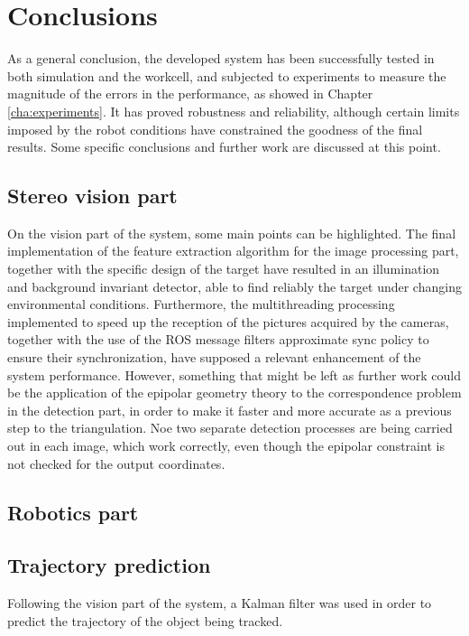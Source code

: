 
\chapter{Conclusions} %
\label{cha:conclusions}
As a general conclusion, the developed system has been successfully tested in both simulation and the workcell, and subjected to experiments to measure the magnitude of the errors in the performance, as showed in Chapter \ref{cha:experiments}.
It has proved robustness and reliability, although certain limits imposed by the robot conditions have constrained the goodness of the final results. Some specific conclusions and further work are discussed at this point.

\section{Stereo vision part}
On the vision part of the system, some main points can be highlighted.
The final implementation of the feature extraction algorithm for the image processing part, together with the specific design of the target have resulted in an illumination and background invariant detector, able to find reliably the target under changing environmental conditions.
Furthermore, the multithreading processing implemented to speed up the reception of the pictures acquired by the cameras, together with the use of the ROS message filters approximate sync policy to ensure their synchronization, have supposed a relevant enhancement of the system performance.
However, something that might be left as further work could be the application of the epipolar geometry theory to the correspondence problem in the detection part, in order to make it faster and more accurate as a previous step to the triangulation. 
Noe two separate detection processes are being carried out in each image, which work correctly, even though the epipolar constraint is not checked for the output coordinates.

\section{Robotics part}

\section{Trajectory prediction}
Following the vision part of the system, a Kalman filter was used in order to predict the trajectory of the object being tracked.\\

